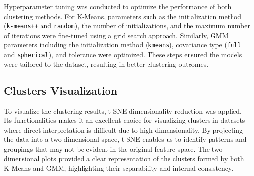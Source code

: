         Hyperparameter tuning was conducted to optimize the performance of both clustering methods. For K-Means, parameters such as the initialization method (\texttt{k-means++} and \texttt{random}), the number of initializations, and the maximum number of iterations were fine-tuned using a grid search approach. Similarly, GMM parameters including the initialization method (\texttt{kmeans}), covariance type (\texttt{full} and \texttt{spherical}), and tolerance were optimized. These steps ensured the models were tailored to the dataset, resulting in better clustering outcomes.

    \subsection{Clusters Visualization}
    
        To visualize the clustering results, t-SNE dimensionality reduction was applied. Its functionalities makes it an excellent choice for visualizing clusters in datasets where direct interpretation is difficult due to high dimensionality. By projecting the data into a two-dimensional space, t-SNE enables us to identify patterns and groupings that may not be evident in the original feature space. The two-dimensional plots provided a clear representation of the clusters formed by both K-Means and GMM, highlighting their separability and internal consistency.
        
